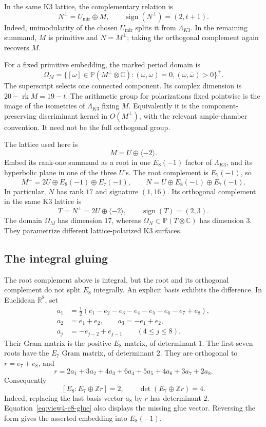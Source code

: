In the same K3 lattice, the complementary relation is
\[
 N^\perp=U_{\mathrm{mir}}\oplus M,
 \qquad \operatorname{sign}(N^\perp)=(2,t+1).
\]
Indeed, unimodularity of the chosen \(U_{\mathrm{mir}}\)
splits it from \(\Lambda_{K3}\). In the remaining summand,
\(M\) is primitive and \(N=M^\perp\); taking the orthogonal
complement again recovers \(M\).

For a fixed primitive embedding, the marked period domain is
\[
 \Omega_M=\{[\omega]\in\mathbb P(M^\perp\otimes\mathbb C):
       (\omega,\omega)=0,
       (\omega,\overline\omega)>0\}^{+}.
\]
The superscript selects one connected component. Its complex
 dimension is \(20-\operatorname{rk}M=19-t\).
The arithmetic group for polarizations fixed pointwise is the image
of the isometries of \(\Lambda_{K3}\) fixing \(M\). Equivalently it
is the component-preserving discriminant kernel in
\(O(M^\perp)\), with the relevant ample-chamber convention.
It need not be the full orthogonal group.

The lattice used here is
\[
 M=U\oplus\langle-2\rangle.
\]
Embed its rank-one summand as a root in one \(E_8(-1)\) factor of
\(\Lambda_{K3}\), and its hyperbolic plane in one of the three
\(U\)'s. The root complement is \(E_7(-1)\), so
\[
 M^\perp=2U\oplus E_8(-1)\oplus E_7(-1),\qquad
 N=U\oplus E_8(-1)\oplus E_7(-1).
\]
In particular, \(N\) has rank \(17\) and signature \((1,16)\).
Its orthogonal complement in the same K3 lattice is
\[
 T=N^\perp=2U\oplus\langle-2\rangle,
 \qquad \operatorname{sign}(T)=(2,3).
\]
The domain \(\Omega_M\) has dimension \(17\), whereas
\(\Omega_N\subset\mathbb P(T\otimes\mathbb C)\) has dimension
\(3\). They parametrize different lattice-polarized K3 surfaces.

\subsection{The integral gluing}
\label{subsec:view4-lattice-check}

The root complement above is integral, but the root and its
orthogonal complement do not split \(E_8\) integrally. An explicit
basis exhibits the difference. In Euclidean \(\mathbb R^8\), set
\[
 \begin{split}
 a_1&=\tfrac12(e_1-e_2-e_3-e_4-e_5-e_6-e_7+e_8),\\
 a_2&=e_1+e_2,\qquad a_3=-e_1+e_2,\\
 a_j&=-e_{j-2}+e_{j-1}\qquad(4\le j\le8).
 \end{split}
\]
Their Gram matrix is the positive \(E_8\) matrix, of determinant
\(1\). The first seven roots have the \(E_7\) Gram matrix, of
 determinant \(2\). They are orthogonal to \(r=e_7+e_8\), and
\begin{equation}\label{eq:view4-e8-glue}
 r=2a_1+3a_2+4a_3+6a_4+5a_5+4a_6+3a_7+2a_8.
\end{equation}
Consequently
\[
 [E_8:E_7\oplus\mathbb Zr]=2,
 \qquad \det(E_7\oplus\mathbb Zr)=4.
\]
Indeed, replacing the last basis vector \(a_8\) by \(r\) has
 determinant \(2\). Equation~\eqref{eq:view4-e8-glue} also displays
 the missing glue vector. Reversing the form gives the asserted
 embedding into \(E_8(-1)\).

